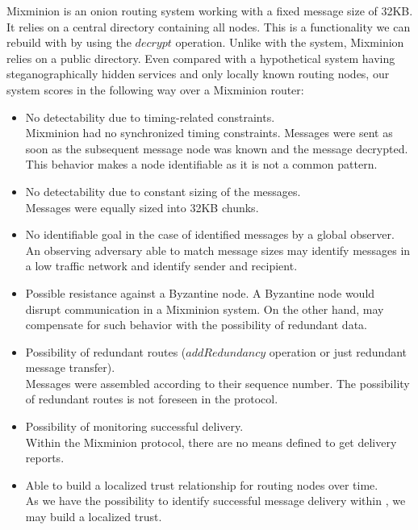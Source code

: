 Mixminion is an onion routing system working with a fixed message size of 32KB. It relies on a central directory containing all nodes. This is a functionality we can rebuild with \MessageVortex{} by using the $decrypt$ operation. Unlike with the \MessageVortex{} system, Mixminion relies on a public directory. Even compared with a hypothetical system having steganographically hidden services and only locally known routing nodes, our system scores in the following way over a Mixminion router:

\begin{itemize}
	\item No detectability due to timing-related constraints.\\
	Mixminion had no synchronized timing constraints. Messages were sent as soon as the subsequent message node was known and the message decrypted. This behavior makes a node identifiable as it is not a common pattern.
	\item No detectability due to constant sizing of the messages.\\
	Messages were equally sized into 32KB chunks.%
	\item No identifiable goal in the case of identified messages by a global observer.\\
	An observing adversary able to match message sizes may identify messages in a low traffic network and identify sender and recipient. 
	\item Possible resistance against a Byzantine node.
	A Byzantine node would disrupt communication in a Mixminion system. On the other hand, \MessageVortex{} may compensate for such behavior with the possibility of redundant data.
	\item Possibility of redundant routes ($addRedundancy$ operation or just redundant message transfer).\\
	Messages were assembled according to their sequence number. The possibility of redundant routes is not foreseen in the protocol.
	\item Possibility of monitoring successful delivery.\\
	Within the Mixminion protocol, there are no means defined to get delivery reports.
	\item Able to build a localized trust relationship for routing nodes over time.\\
	As we have the possibility to identify successful message delivery within \MessageVortex{}, we may build a localized trust.
\end{itemize}

